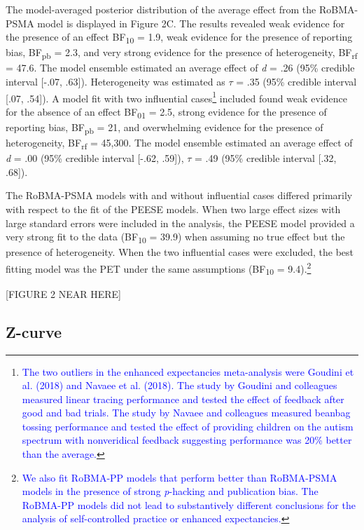 \documentclass[
  man, donotrepeattitle,mask,floatsintext]{apa7}
\begin{document}
The model-averaged posterior distribution of the average effect from the RoBMA-PSMA model is displayed in Figure 2C. The results revealed weak evidence for the presence of an effect BF\textsubscript{10} = 1.9, weak evidence for the presence of reporting bias, BF\textsubscript{pb} = 2.3, and very strong evidence for the presence of heterogeneity, BF\textsubscript{rf} = 47.6. The model ensemble estimated an average effect of \emph{d} = .26 (95\% credible interval {[}-.07, .63{]}). Heterogeneity was estimated as \(\tau\) = .35 (95\% credible interval {[}.07, .54{]}). A model fit with two influential cases\footnote{\textcolor{blue}{The two outliers in the enhanced expectancies meta-analysis were Goudini et al. (2018) and Navaee et al. (2018). The study by Goudini and colleagues measured linear tracing performance and tested the effect of feedback after good and bad trials. The study by Navaee and colleagues measured beanbag tossing performance and tested the effect of providing children on the autism spectrum with nonveridical feedback suggesting performance was 20\% better than the average.}} included found weak evidence for the absence of an effect BF\textsubscript{01} = 2.5, strong evidence for the presence of reporting bias, BF\textsubscript{pb} = 21, and overwhelming evidence for the presence of heterogeneity, BF\textsubscript{rf} = 45,300. The model ensemble estimated an average effect of \emph{d} = .00 (95\% credible interval {[}-.62, .59{]}), \(\tau\) = .49 (95\% credible interval {[}.32, .68{]}).

The RoBMA-PSMA models with and without influential cases differed primarily with respect to the fit of the PEESE models. When two large effect sizes with large standard errors were included in the analysis, the PEESE model provided a very strong fit to the data (BF\textsubscript{10} = 39.9) when assuming no true effect but the presence of heterogeneity. When the two influential cases were excluded, the best fitting model was the PET under the same assumptions (BF\textsubscript{10} = 9.4).\footnote{\textcolor{blue}{We also fit RoBMA-PP models that perform better than RoBMA-PSMA models in the presence of strong \emph{p}-hacking and publication bias. The RoBMA-PP models did not lead to substantively different conclusions for the analysis of self-controlled practice or enhanced expectancies.}}

\begin{center}
[FIGURE 2 NEAR HERE]
\end{center}

\hypertarget{z-curve-1}{%
\subsection{Z-curve}\label{z-curve-1}}
\end{document}
